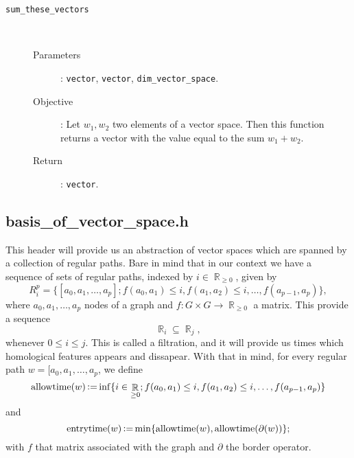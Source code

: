\documentclass[11pt,a4paper]{article}
\DeclareMathOperator{\R}{\mathbb{R}}
\DeclareMathOperator{\allowtime}{allow time}
\DeclareMathOperator{\entrytime}{entry time}
\DeclareMathOperator{\definedAs}{\vcentcolon = }
\begin{document}
\begin{description}
	\item [\texttt{sum\_these\_vectors}] \hfill \\[-0.5cm]
		\begin{description}
			\item [Parameters]: \texttt{vector}, \texttt{vector}, \texttt{dim\_vector\_space}.
			\item [Objective]: Let $w_1, w_2$ two elements of a vector space.
				Then this function returns a vector with the value equal
				to the sum $w_1 + w_2$.
			\item [Return]: \texttt{vector}.
		\end{description}
\end{description}

\subsection{basis\_of\_vector\_space.h}

This header will provide us an abstraction of  vector spaces which are spanned by a collection of regular paths.
Bare in mind that in our context we have a sequence of sets of regular paths, indexed by $i \in \R_{\geq 0}$,
given by
\[
	R^p_i = \{ [a_0, a_1, \ldots, a_p]; f(a_0, a_1) \leq i, f(a_1, a_2) \leq i, \ldots, f(a_{p-1}, a_p) \},
\]
where $a_0, a_1, \ldots, a_p$ nodes of a graph and $f:G \times G \to \R_{\geq 0}$ a matrix. This provide
a sequence 
\[
	\R_i \subseteq \R_{j}, 
\]
whenever $0 \leq i \leq j$. This is called a filtration, and it will provide us times which
homological features appears and dissapear. With that in mind, for every regular path 
$w = [a_0, a_1, \ldots, a_p$,
we define
\[
	\allowtime(w) \definedAs \inf \{ i \in \R_{\geq 0}; f(a_0, a_1) \leq i, f(a_1, a_2) \leq i,
	\ldots, f(a_{p-1}, a_p) \}
\]
and 
\[
	\entrytime(w) \definedAs \min\{\allowtime(w), \allowtime(\partial(w))\};
\]
with $f$ that matrix associated with the graph and $\partial$ the border operator.

\end{document}
